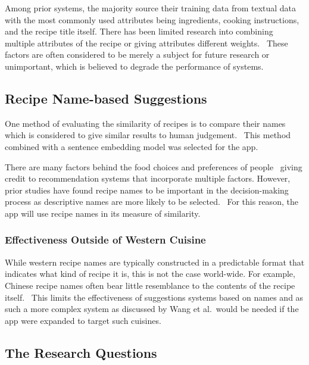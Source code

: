 Among prior systems, the majority source their training data from textual data with the most commonly used
attributes being ingredients, cooking instructions, and the recipe title itself. There has been limited research
into combining multiple attributes of the recipe or giving attributes different weights.~\cite{chen_cross-modal_2017} These factors are often
considered to be merely a subject for future research or unimportant, which is believed to degrade the performance
of systems.~\cite{bondevik_systematic_2024}

\subsection{Recipe Name-based Suggestions}\label{sec:recipe_name_suggestions}

One method of evaluating the similarity of recipes is to compare their names which is considered to
give similar results to human judgement.~\cite{trattner_learning_2020,starke_serving_2021} This method
combined with a sentence embedding model was selected for the \chef{} app.

There are many factors behind the food choices and preferences of people~\cite{leng_determinants_2017,franchi_food_2012}
giving credit to recommendation systems that incorporate multiple factors. However, prior studies have
found recipe names to be important in the decision-making process as descriptive names are more likely to be
selected.~\cite{ohlhausen_when_2020} For this reason, the \chef{} app will use recipe names in its measure of similarity.

\subsubsection{Effectiveness Outside of Western Cuisine}
While western recipe names are typically constructed in a predictable format
that indicates what kind of recipe it is, this is not the case world-wide.
For example, Chinese recipe names often bear little resemblance to the contents
of the recipe itself.~\cite{wang_substructure_2008} This limits the effectiveness
of suggestions systems based on names and as such a more complex system as discussed
by Wang et al.\ would be needed if the app were expanded to target such cuisines.

\subsection{The Research Questions}

